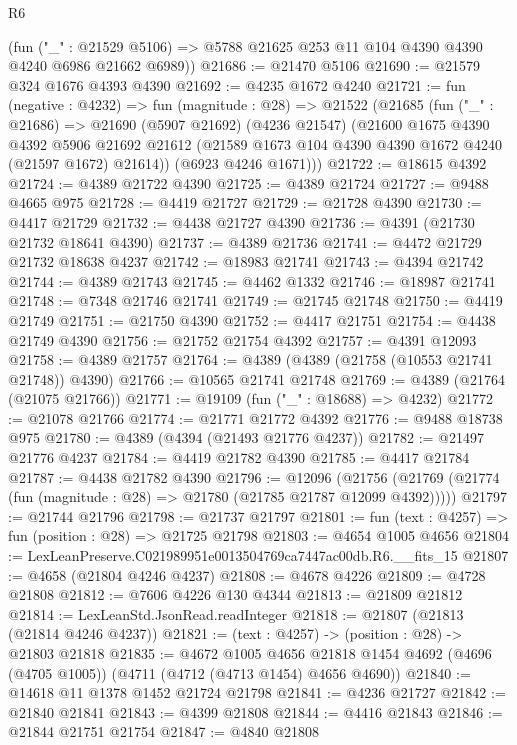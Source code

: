 \begin{lexlean}{R6}
\begin{coremodule}
      (fun ("_" : @21529 @5106) => @5788 @21625 @253 @11 @104 @4390 @4390 @4240 @6986 @21662 @6989))
@21686 := @21470 @5106
@21690 := @21579 @324 @1676 @4393 @4390
@21692 := @4235 @1672 @4240
@21721 := fun (negative : @4232) =>
  fun (magnitude : @28) =>
  @21522
    (@21685
      (fun ("_" : @21686) =>
      @21690
        (@5907 @21692)
        (@4236 @21547)
        (@21600
          @1675
          @4390
          @4392
          @5906
          @21692
          @21612
          (@21589 @1673 @104 @4390 @4390 @1672 @4240 (@21597 @1672) @21614))
        (@6923 @4246 @1671)))
@21722 := @18615 @4392
@21724 := @4389 @21722 @4390
@21725 := @4389 @21724
@21727 := @9488 @4665 @975
@21728 := @4419 @21727
@21729 := @21728 @4390
@21730 := @4417 @21729
@21732 := @4438 @21727 @4390
@21736 := @4391 (@21730 @21732 @18641 @4390)
@21737 := @4389 @21736
@21741 := @4472 @21729 @21732 @18638 @4237
@21742 := @18983 @21741
@21743 := @4394 @21742
@21744 := @4389 @21743
@21745 := @4462 @1332
@21746 := @18987 @21741
@21748 := @7348 @21746 @21741
@21749 := @21745 @21748
@21750 := @4419 @21749
@21751 := @21750 @4390
@21752 := @4417 @21751
@21754 := @4438 @21749 @4390
@21756 := @21752 @21754 @4392
@21757 := @4391 @12093
@21758 := @4389 @21757
@21764 := @4389 (@4389 (@21758 (@10553 @21741 @21748)) @4390)
@21766 := @10565 @21741 @21748
@21769 := @4389 (@21764 (@21075 @21766))
@21771 := @19109 (fun ("_" : @18688) => @4232)
@21772 := @21078 @21766
@21774 := @21771 @21772 @4392
@21776 := @9488 @18738 @975
@21780 := @4389 (@4394 (@21493 @21776 @4237))
@21782 := @21497 @21776 @4237
@21784 := @4419 @21782 @4390
@21785 := @4417 @21784
@21787 := @4438 @21782 @4390
@21796 := @12096
    (@21756 (@21769 (@21774 (fun (magnitude : @28) => @21780 (@21785 @21787 @12099 @4392)))))
@21797 := @21744 @21796
@21798 := @21737 @21797
@21801 := fun (text : @4257) => fun (position : @28) => @21725 @21798
@21803 := @4654 @1005 @4656
@21804 := LexLeanPreserve.C021989951e0013504769ca7447ac00db.R6.__fits_15
@21807 := @4658 (@21804 @4246 @4237)
@21808 := @4678 @4226
@21809 := @4728 @21808
@21812 := @7606 @4226 @130 @4344
@21813 := @21809 @21812
@21814 := LexLeanStd.JsonRead.readInteger
@21818 := @21807 (@21813 (@21814 @4246 @4237))
@21821 := (text : @4257) -> (position : @28) -> @21803 @21818
@21835 := @4672
    @1005
    @4656
    @21818
    @1454
    @4692
    (@4696 (@4705 @1005))
    (@4711 (@4712 (@4713 @1454) @4656 @4690))
@21840 := @14618 @11 @1378 @1452 @21724 @21798
@21841 := @4236 @21727
@21842 := @21840 @21841
@21843 := @4399 @21808
@21844 := @4416 @21843
@21846 := @21844 @21751 @21754
@21847 := @4840 @21808

\end{coremodule}
\end{lexlean}
